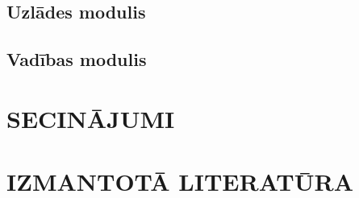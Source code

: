 \documentclass[12pt,fleqn,titlepage,oneside]{article}
\numberwithin{equation}{section}
\numberwithin{figure}{section}
\numberwithin{table}{section}
\begin{document}
\subsection{Uzlādes modulis}

\subsection{Vadības modulis}

\FloatBarrier
\newpage
\section{\texorpdfstring{\MakeUppercase{Secinājumi}}{Secinājumi}}

\FloatBarrier
\newpage
\section{\texorpdfstring{\MakeUppercase{Izmantotā literatūra}}{Izmantotā literatūra}}
\end{document}
